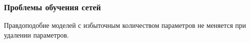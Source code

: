 \documentclass[usenames,dvipsnames,11pt,pdf,utf8,russian,aspectratio=169]{beamer}
\begin{document}
\begin{frame}                                                                                                                                   
\frametitle{Проблемы обучения сетей}                                                                                                          
Правдоподобие моделей с избыточным количеством параметров не меняется при удалении параметров.                                                       
\begin{figure}[h]                                                                                                                               
\centering                                                                                                                                      
\end{figure}                                                                                                                                    
                                                                                                                                                
\end{frame}    
\end{document}
